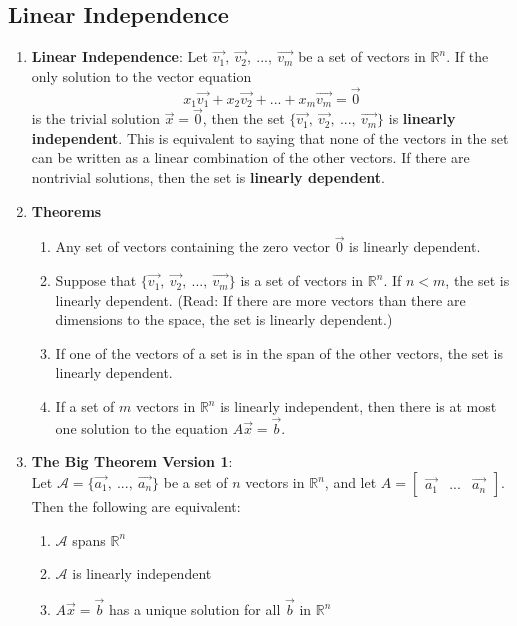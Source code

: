 \documentclass[10pt]{article}
\begin{document}
\subsection{Linear Independence}
\begin{enumerate}
\item \textbf{Linear Independence}: Let $\vec{v_1},\ \vec{v_2},\ ...,\ \vec{v_m}$ be a set of vectors in $\mathbb{R}^n$. If the only solution to the vector equation 
$$x_1\vec{v_1} + x_2\vec{v_2} + ... + x_m\vec{v_m} = \vec{0}$$
is the trivial solution $\vec{x} = \vec{0}$, then the set $\lbrace \vec{v_1},\ \vec{v_2},\ ...,\ \vec{v_m} \rbrace$ is \textbf{linearly independent}. This is equivalent to saying that none of the vectors in the set can be written as a linear combination of the other vectors. If there are nontrivial solutions, then the set is \textbf{linearly dependent}.
\item \textbf{Theorems}
\begin{enumerate}
\item Any set of vectors containing the zero vector $\vec{0}$ is linearly dependent.
\item Suppose that $\lbrace \vec{v_1},\ \vec{v_2},\ ...,\ \vec{v_m} \rbrace$ is a set of vectors in $\mathbb{R}^n$. If $n < m$, the set is linearly dependent. (Read: If there are more vectors than there are dimensions to the space, the set is linearly dependent.)
\item If one of the vectors of a set is in the span of the other vectors, the set is linearly dependent.
\item If a set of $m$ vectors in $\mathbb{R}^n$ is linearly independent, then there is at most one solution to the equation $A\vec{x} = \vec{b}$.
\end{enumerate}
\item \textbf{The Big Theorem Version 1}: \\
Let $\mathcal{A} = \lbrace \vec{a_1},\ ...,\ \vec{a_n} \rbrace$ be a set of $n$ vectors in $\mathbb{R}^n$, and let $A = \begin{bmatrix}
\vec{a_1} & ... & \vec{a_n}
\end{bmatrix}$. Then the following are equivalent:
\begin{enumerate}
\item $\mathcal{A}$ spans $\mathbb{R}^n$
\item $\mathcal{A}$ is linearly independent
\item $A\vec{x} = \vec{b}$ has a unique solution for all $\vec{b}$ in $\mathbb{R}^n$
\end{enumerate}
\end{enumerate}
\end{document}
